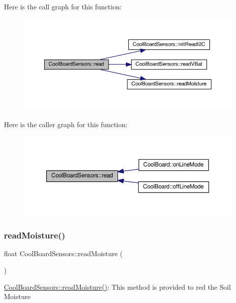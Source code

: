 Here is the call graph for this function\+:\nopagebreak
\begin{figure}[H]
\begin{center}
\leavevmode
\includegraphics[width=350pt]{class_cool_board_sensors_a91badb2539d91fda8679f2a597874c48_cgraph}
\end{center}
\end{figure}
Here is the caller graph for this function\+:\nopagebreak
\begin{figure}[H]
\begin{center}
\leavevmode
\includegraphics[width=350pt]{class_cool_board_sensors_a91badb2539d91fda8679f2a597874c48_icgraph}
\end{center}
\end{figure}
\mbox{\label{class_cool_board_sensors_a8761bff50373c485f4465c8db47d0633}} 
\subsubsection{\texorpdfstring{read\+Moisture()}{readMoisture()}}
{\footnotesize\ttfamily float Cool\+Board\+Sensors\+::read\+Moisture (\begin{DoxyParamCaption}{ }\end{DoxyParamCaption})}

\hyperlink{class_cool_board_sensors_a8761bff50373c485f4465c8db47d0633}{Cool\+Board\+Sensors\+::read\+Moisture()}\+: This method is provided to red the Soil Moisture 

